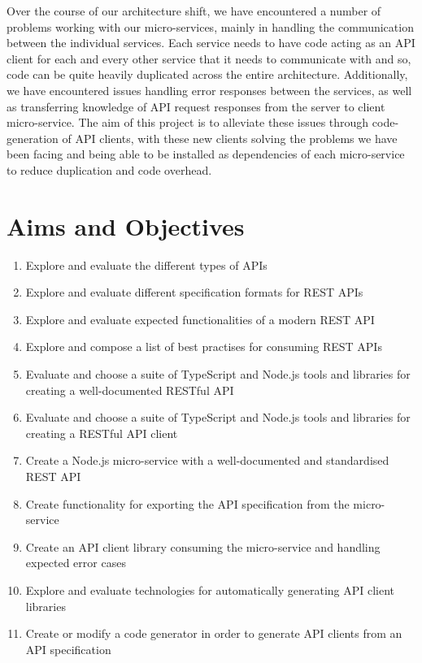 Over the course of our architecture shift, we have encountered a number of problems working with our micro-services, mainly in handling the communication between the individual services. Each service needs to have code acting as an API client for each and every other service that it needs to communicate with and so, code can be quite heavily duplicated across the entire architecture. Additionally, we have encountered issues handling error responses between the services, as well as transferring knowledge of API request responses from the server to client micro-service. The aim of this project is to alleviate these issues through code-generation of API clients, with these new clients solving the problems we have been facing and being able to be installed as dependencies of each micro-service to reduce duplication and code overhead.

\section{Aims and Objectives}
 \begin{enumerate}
   \item Explore and evaluate the different types of APIs
   \item Explore and evaluate different specification formats for REST APIs
   \item Explore and evaluate expected functionalities of a modern REST API
   \item Explore and compose a list of best practises for consuming REST APIs
   \item Evaluate and choose a suite of TypeScript and Node.js tools and libraries for creating a well-documented RESTful API
   \item Evaluate and choose a suite of TypeScript and Node.js tools and libraries for creating a RESTful API client
   \item Create a Node.js micro-service with a well-documented and standardised REST API
   \item Create functionality for exporting the API specification from the micro-service
   \item Create an API client library consuming the micro-service and handling expected error cases
   \item Explore and evaluate technologies for automatically generating API client libraries
   \item Create or modify a code generator in order to generate API clients from an API specification
 \end{enumerate} 
